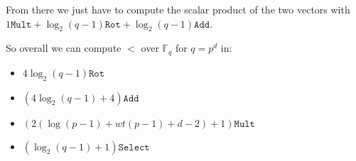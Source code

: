 From there we just have to compute the scalar product of the two vectors with $1\texttt{Mult} + \log_2(q-1)\texttt{Rot} + \log_2(q-1)\texttt{Add}$. \newline

So overall we can compute $<$ over $\mathbb{F}_q$ for $q = p^d$ in:

\begin{itemize}
\item $4\log_2 (q-1) \texttt{Rot}$
\item $(4\log_2 (q-1) + 4) \texttt{Add}$
\item $(2(\log (p-1) + wt(p-1) + d - 2) + 1) \texttt{Mult}$
\item $(\log_2 (q-1) + 1) \texttt{Select}$
\end{itemize}


